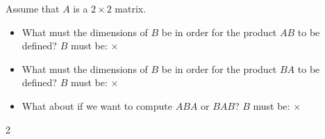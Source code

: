 \documentclass{ximera}
\begin{document}
\begin{exercise}
    Assume that $A$ is a $2 \times 2$ matrix.
    \begin{itemize}
        \item What must the dimensions of $B$ be in order for the product $AB$ to be defined? $B$ must be:  $\times$
        \item What must the dimensions of $B$ be in order for the product $BA$ to be defined? $B$ must be:  $\times$
        \item What about if we want to compute $ABA$ or $BAB$? $B$ must be: $\times$
    \end{itemize} 2
\end{exercise}
\end{document}
